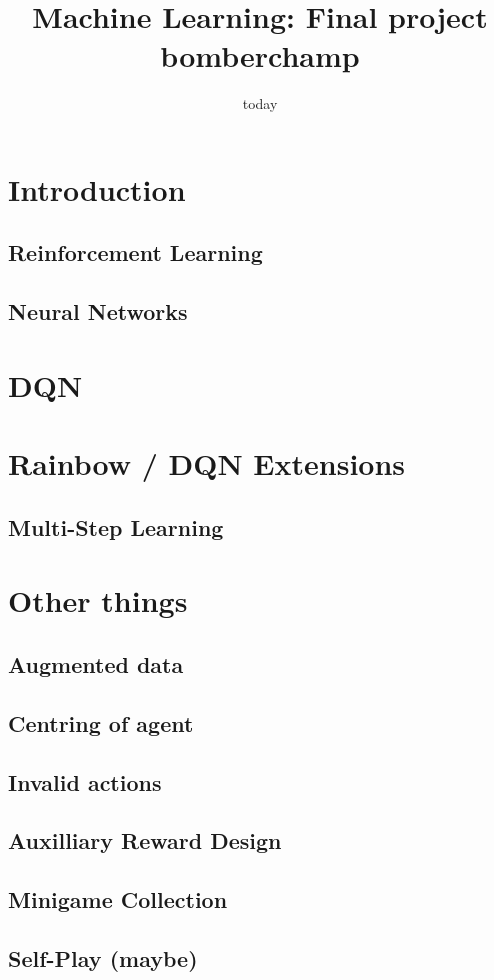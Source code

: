 \documentclass[12pt]{article}
\title{Machine Learning: Final project bomberchamp}
\date{today}
\begin{document}
\section{Introduction}

\subsection{Reinforcement Learning}

\subsection{Neural Networks}

\section{DQN}

\section{Rainbow / DQN Extensions}

\subsection{Multi-Step Learning} %
% 

\section{Other things}
\subsection{Augmented data}
\subsection{Centring of agent} %
\subsection{Invalid actions} %
\subsection{Auxilliary Reward Design}
\subsection{Minigame Collection} %
\subsection{Self-Play (maybe)}
\end{document}
